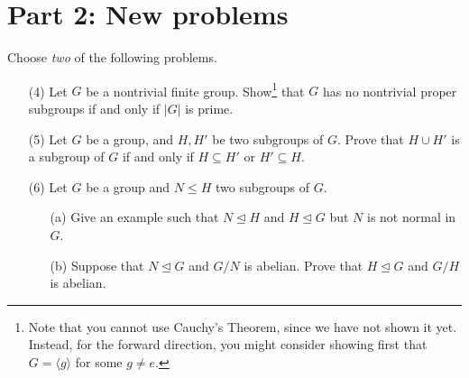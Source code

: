\documentclass[11pt]{article}
\theoremstyle{definition}
\begin{document}
\section*{Part 2: New problems}

Choose \emph{two} of the following problems.

\begin{enumerate}
 
 \item[(4)] Let $G$ be a nontrivial finite group. Show\footnote{Note that you cannot use Cauchy's Theorem, since we have not shown it yet. Instead, for the forward direction, you might consider showing first that $G=\langle g\rangle$ for some $g\neq e$.}  that $G$ has no nontrivial proper subgroups if and only if $|G|$ is prime. 



\item[(5)] Let $G$ be a group, and $H, H'$ be two subgroups of $G$. Prove that $H\cup H'$ is a subgroup of $G$ if and only if $H\subseteq H'$ or $H' \subseteq H$.


\item[(6)] Let $G$ be a group and $N\leq H$ two subgroups of $G$.
\begin{enumerate}
\item[(a)] Give an example such that $N\trianglelefteq H$ and $H\trianglelefteq G$ but $N$ is not normal in $G$.
\item[(b)] Suppose that $N\trianglelefteq G$ and $G/N$ is abelian. Prove that $H \trianglelefteq G$ and $G/H$ is abelian. 
\end{enumerate}

\end{enumerate}
\end{document}
